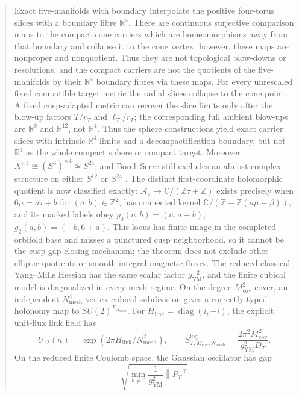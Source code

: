 \documentclass[11pt,letterpaper]{article}
\theoremstyle{definition}
\theoremstyle{remark}
\begin{document}
\begin{abstract}
Exact five-manifolds with boundary interpolate the positive four-torus
slices with a boundary fibre \(\mathbb R^4\).  There are continuous
surjective comparison maps to the compact cone carriers which are
homeomorphisms away from that boundary and collapse it to the cone vertex;
however, these maps are nonproper and nonquotient.  Thus they are not
topological blow-downs or resolutions, and the compact carriers are not the
quotients of the five-manifolds by their \(\mathbb R^4\) boundary fibres via
these maps.  For every unrescaled fixed compatible
target metric the radial slices collapse to the cone point.  A fixed
 cusp-adapted metric can recover the slice limits only after the blow-up
 factors \(T/r_T\) and \(\ell_T/r_T\); the corresponding full ambient
 blow-ups are \(\mathbb R^8\) and \(\mathbb R^{12}\), not \(\mathbb R^4\).
 Thus the sphere constructions yield exact carrier slices with intrinsic
 \(\mathbb R^4\) limits and a decompactification boundary, but not
 \(\mathbb R^4\) as the whole
 compact sphere or compact target.  Moreover
 \(X^{\times4}\cong(S^6)^{\times4}\not\simeq S^{24}\), and
 Borel--Serre still excludes an almost-complex structure on either
 \(S^{12}\) or \(S^{24}\) \cite{BorelSerre1953}.
 The distinct first-coordinate holomorphic quotient is now classified exactly:
 \(\mathcal A_z\to\mathbb C/(\mathbb Z\tau+\mathbb Z)\) exists precisely when
 \(6\mu=a\tau+b\) for \((a,b)\in\mathbb Z^2\), has connected kernel
 \(\mathbb C/(\mathbb Z+\mathbb Z(a\mu-\beta))\), and its marked labels obey
 \(g_0(a,b)=(a,a+b)\), \(g_2(a,b)=(-b,6+a)\).  This locus has finite image in
 the completed orbifold base and misses a punctured cusp neighborhood, so it
 cannot be the cusp gap-closing mechanism; the theorem does not exclude other
 elliptic quotients or smooth integral magnetic fluxes.
 The reduced classical Yang--Mills Hessian has the same scalar factor
 \(g_{\mathrm{YM}}^{-2}\), and the finite cubical model is diagonalized in
 every mesh regime.  On the degree-\(M_{\mathrm{cov}}^2\) cover, an
 independent \(N_{\mathrm{mesh}}^4\)-vertex cubical subdivision gives a
 correctly typed holonomy map to \(SU(2)^{E_{N_{\mathrm{mesh}}}}\).  For
 \(H_{\mathrm{link}}=\operatorname{diag}(i,-i)\), the explicit unit-flux
 link field has
 \[
  U_{12}(n)=\exp(2\pi H_{\mathrm{link}}/N_{\mathrm{mesh}}^2),\qquad
  S^{\log}_{T,M_{\mathrm{cov}},N_{\mathrm{mesh}}}
  =\frac{2\pi^2M_{\mathrm{cov}}^2}
         {g_{\mathrm{YM}}^2D_T}.
 \]
 On the reduced finite Coulomb space, the Gaussian oscillator has gap
 \[
  \sqrt{\min_{k\ne0}\frac1{g_{\mathrm{YM}}^2}
   \left\lVert P_T^{-\top}
}\]
\end{abstract}
\end{document}
